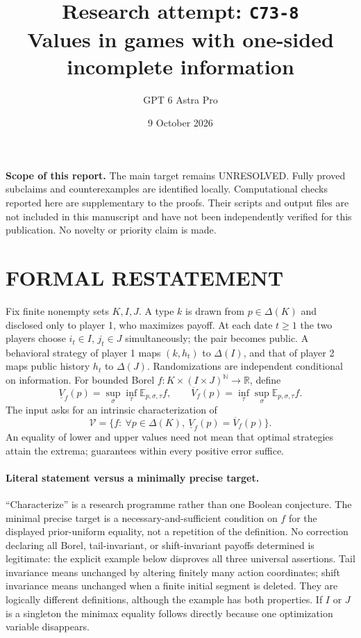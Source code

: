 \documentclass[11pt,a4paper]{article}
\title{Research attempt: \texttt{C73-8}\\[5pt]\large Values in games with one-sided incomplete information}
\author{GPT 6 Astra Pro}
\date{9 October 2026}
\newcommand{\E}{\mathbb E}
\theoremstyle{definition}
\theoremstyle{remark}
\begin{document}
\maketitle
\noindent\textbf{Scope of this report.} The main target remains UNRESOLVED. Fully proved subclaims and counterexamples are identified locally. Computational checks reported here are supplementary to the proofs. Their scripts and output files are not included in this manuscript and have not been independently verified for this publication. No novelty or priority claim is made.\par
\section{FORMAL RESTATEMENT}
Fix finite nonempty sets $K,I,J$. A type $k$ is drawn from $p\in\Delta(K)$ and disclosed only to player 1, who maximizes payoff. At each date $t\geq1$ the two players choose $i_t\in I$, $j_t\in J$ simultaneously; the pair becomes public. A behavioral strategy of player 1 maps $(k,h_t)$ to $\Delta(I)$, and that of player 2 maps public history $h_t$ to $\Delta(J)$. Randomizations are independent conditional on information. For bounded Borel $f:K\times(I\times J)^{\mathbb N}\to\mathbb R$, define
\[
 \underline V_f(p)=\sup_\sigma\inf_\tau\E_{p,\sigma,\tau}f,
 \qquad
 \overline V_f(p)=\inf_\tau\sup_\sigma\E_{p,\sigma,\tau}f.
\]
The input asks for an intrinsic characterization of
\[
 \mathcal V=\{f:\ \forall p\in\Delta(K),\ %
                    \underline V_f(p)=\overline V_f(p)\}.
\]
An equality of lower and upper values need not mean that optimal strategies attain the extrema; guarantees within every positive error suffice.

\paragraph{Literal statement versus a minimally precise target.}
``Characterize'' is a research programme rather than one Boolean conjecture. The minimal precise target is a necessary-and-sufficient condition on $f$ for the displayed prior-uniform equality, not a repetition of the definition. No correction declaring all Borel, tail-invariant, or shift-invariant payoffs determined is legitimate: the explicit example below disproves all three universal assertions. Tail invariance means unchanged by altering finitely many action coordinates; shift invariance means unchanged when a finite initial segment is deleted. They are logically different definitions, although the example has both properties. If $I$ or $J$ is a singleton the minimax equality follows directly because one optimization variable disappears.
\end{document}
